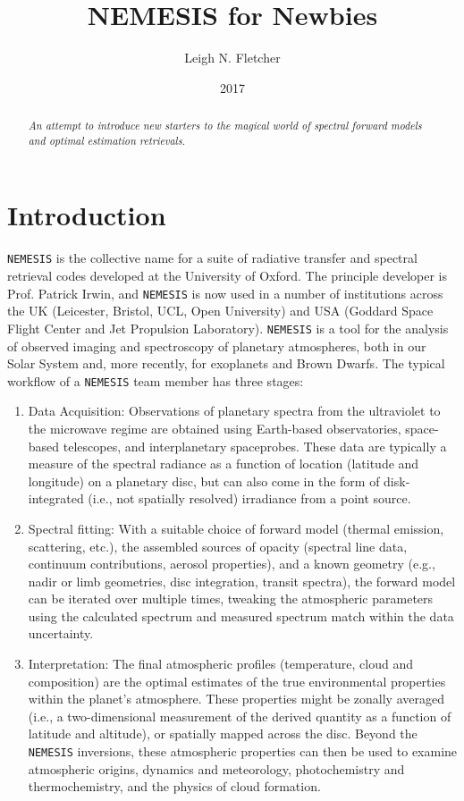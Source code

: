 \documentclass[final,5p,times,twocolumn,authoryear]{elsarticle}
\title{NEMESIS for Newbies}
\author{Leigh N. Fletcher}
\date{2017}                                           %
\begin{document}
\begin{abstract}
\textit{An attempt to introduce new starters to the magical world of spectral forward models and optimal estimation retrievals.}
\end{abstract}

\maketitle



\tableofcontents

\section{Introduction}

\verb#NEMESIS# is the collective name for a suite of radiative transfer and spectral retrieval codes developed at the University of Oxford.  The principle developer is Prof. Patrick Irwin, and \verb#NEMESIS# is now used in a number of institutions across the UK (Leicester, Bristol, UCL, Open University) and USA (Goddard Space Flight Center and Jet Propulsion Laboratory).  \verb#NEMESIS# is a tool for the analysis of observed imaging and spectroscopy of planetary atmospheres, both in our Solar System and, more recently, for exoplanets and Brown Dwarfs.  The typical workflow of a \verb#NEMESIS# team member has three stages:

\begin{enumerate}
    \item Data Acquisition:  Observations of planetary spectra from the ultraviolet to the microwave regime are obtained using Earth-based observatories, space-based telescopes, and interplanetary spaceprobes.  These data are typically a measure of the spectral radiance as a function of location (latitude and longitude) on a planetary disc, but can also come in the form of disk-integrated (i.e., not spatially resolved) irradiance from a point source. 
    \item Spectral fitting:  With a suitable choice of forward model (thermal emission, scattering, etc.), the assembled sources of opacity (spectral line data, continuum contributions, aerosol properties), and a known geometry (e.g., nadir or limb geometries, disc integration, transit spectra), the forward model can be iterated over multiple times, tweaking the atmospheric parameters using the calculated spectrum and measured spectrum match within the data uncertainty.
    \item Interpretation:  The final atmospheric profiles (temperature, cloud and composition) are the optimal estimates of the true environmental properties within the planet's atmosphere.  These properties might be zonally averaged (i.e., a two-dimensional measurement of the derived quantity as a function of latitude and altitude), or spatially mapped across the disc.  Beyond the \verb#NEMESIS# inversions, these atmospheric properties can then be used to examine atmospheric origins, dynamics and meteorology, photochemistry and thermochemistry, and the physics of cloud formation.
\end{enumerate}
\end{document}

